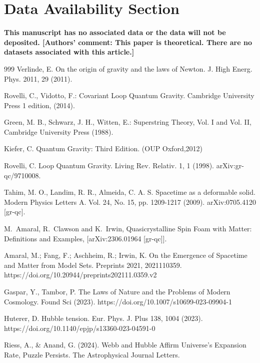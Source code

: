 \documentclass[sn-mathphys-num]{sn-jnl}%
\begin{document}
\section{Data Availability Section}
\textbf{This manuscript has no associated data or
 the data will not be deposited. [Authors’ comment: This paper is theoretical. There are no datasets associated with this article.]}
 
\begin{thebibliography}{999}
%
    Verlinde, E. On the origin of gravity and the laws of Newton. J. High Energ. Phys. 2011, 29 (2011). 	
    
	Rovelli, C., Vidotto, F.:
	Covariant Loop Quantum Gravity.
	  Cambridge University Press  1 edition, (2014).

 	Green, M. B., Schwarz, J. H., Witten, E.: Superstring Theory, Vol. I and Vol. II, Cambridge University Press (1988).

    Kiefer, C. Quantum Gravity: Third Edition. (OUP Oxford,2012)
    
  Rovelli, C. Loop Quantum Gravity. Living Rev. Relativ. 1, 1 (1998). arXiv:gr-qc/9710008.

    Tahim, M. O., Landim, R. R., Almeida, C. A. S. Spacetime as a deformable solid. Modern Physics Letters A. Vol. 24, No. 15, pp. 1209-1217 (2009).
    arXiv:0705.4120 [gr-qc].
    
    M.~Amaral, R.~Clawson and K.~Irwin,
    Quasicrystalline Spin Foam with Matter: Definitions and Examples,
    [arXiv:2306.01964 [gr-qc]].

  Amaral, M.; Fang, F.; Aschheim, R.; Irwin, K. On the Emergence of Spacetime and Matter from Model Sets. Preprints 2021, 2021110359. https://doi.org/10.20944/preprints202111.0359.v2
  
    Gaspar, Y., Tambor, P. The Laws of Nature and the Problems of Modern Cosmology. Found Sci (2023). https://doi.org/10.1007/s10699-023-09904-1
        
    Huterer, D. Hubble tension. Eur. Phys. J. Plus 138, 1004 (2023). https://doi.org/10.1140/epjp/s13360-023-04591-0
        
    Riess, A., \& Anand, G. (2024). Webb and Hubble Affirm Universe’s Expansion Rate, Puzzle Persists. The Astrophysical Journal Letters.
    

\end{thebibliography}
\end{document}
